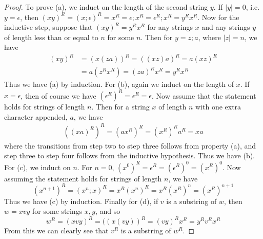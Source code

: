 \documentclass{article}
\theoremstyle{definition}
\theoremstyle{plain}
\theoremstyle{theorem}
\begin{document}
\begin{proof}
	To prove (a), we induct on the length of the second string $y$. If $|y|=0$, i.e. $y=\epsilon$, then $(xy)^R =(x;\epsilon)^R = x^R = \epsilon;x^R = \epsilon^R;x^R = y^Rx^R$. Now for the inductive step, suppose that $(xy)^R = y^Rx^R$ for any strings $x$ and any strings $y$ of length less than or equal to $n$  for some $n$. Then for $y = z;a$, where $|z| = n$, we have 
	\begin{align}
		(xy)^R &= (x(za))^R = ((xz)a)^R = a(xz)^R \\
			&= a(z^Rx^R) = (za)^Rx^R = y^Rx^R
	\end{align}
Thus we have (a) by induction. For (b), again we induct on the length of $x$. If $x = \epsilon$, then of course we have $(\epsilon^R)^R = \epsilon^R = \epsilon$. Now assume that the statement holds for strings of length $n$. Then for a string $x$ of length $n$ with one extra character appended, $a$, we have
\begin{align}
	((xa)^R)^R = (ax^R)^R = (x^R)^Ra^R = xa
\end{align}
where the transitions from step two to step three follows from property (a), and step three to step four follows from the inductive hypothesis. Thus we have (b). For (c), we induct on $n$. For $n=0$, $(x^0)^R = \epsilon^R = (\epsilon^R)^0 = (x^R)^0$. Now assuming the statement holds for strings of length $n$, we have
 \[ (x^{n+1})^R = (x^n;x)^R = x^R(x^n)^R = x^R(x^R)^n = (x^R)^{n+1} \]
 Thus we have (c) by induction. Finally for (d), if $v$ is a substring of $w$, then $w = xvy$ for some strings $x,y$, and so  \[ w^R = (xvy)^R = ((x(vy))^R = (vy)^Rx^R = y^Rv^Rx^R \] From this we can clearly see that $v^R$ is a substring of $w^R$. 
\end{proof}
\end{document}
